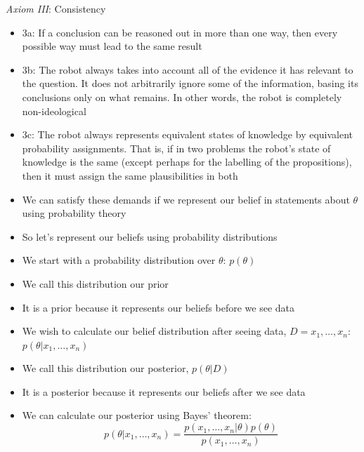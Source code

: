 \documentclass{beamer}
\begin{document}
\frame
{
  \emph{Axiom III}: Consistency
  \begin{itemize}
    \item{3a: If a conclusion can be reasoned out in more than one way, then every possible way must lead to the same result}
    \item{3b: The robot always takes into account all of the evidence it has relevant to the question. It does not arbitrarily ignore some of the information, basing its conclusions only on what remains. In other words, the robot is completely non-ideological}
    \item{3c: The robot always represents equivalent states of knowledge by equivalent probability assignments. That is, if in two problems the robot's state of knowledge is the same (except perhaps for the labelling of the propositions), then it must assign the same plausibilities in both}
  \end{itemize}
}

\frame
{
  \begin{itemize}
    \item{We can satisfy these demands if we represent our belief in statements about $\theta$ using probability theory}
    \item{So let's represent our beliefs using probability distributions}
  \end{itemize}
}

\frame
{
  \begin{itemize}
    \item{We start with a probability distribution over $\theta$: $p(\theta)$}
    \item{We call this distribution our prior}
    \item{It is a prior because it represents our beliefs before we see data}
  \end{itemize}
}

\frame
{
  \begin{itemize}
    \item{We wish to calculate our belief distribution after seeing data, $D = x_1, \ldots, x_n$:
$p(\theta | x_1, \ldots, x_n)$}
    \item{We call this distribution our posterior, $p(\theta | D)$}
    \item{It is a posterior because it represents our beliefs after we see data}
  \end{itemize}
}

\frame
{
  \begin{itemize}
    \item{We can calculate our posterior using Bayes' theorem:}
\[
p(\theta | x_1, \ldots, x_n) = \frac{p(x_1, \ldots, x_n | \theta) p(\theta)}{p(x_1, \ldots, x_n)}
\]
  \end{itemize}
}
\end{document}
